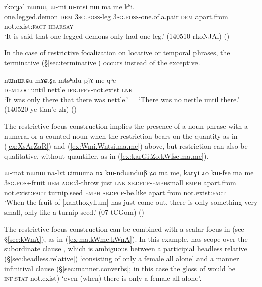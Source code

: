   \begin{exe}
\ex  \label{ex:Wmi.Wntsi.ma.me}
\gll  rkoŋɟɤl nɯnɯ, ɯ-mi ɯ-ntsi nɯ ma me kʰi.   \\
one.legged.demon \textsc{dem} \textsc{3sg}.\textsc{poss}-leg \textsc{3sg}.\textsc{poss}-one.of.a.pair \textsc{dem} apart.from not.exist:\textsc{fact} \textsc{hearsay} \\
\glt  `It is said that one-legged demons only had one leg.' (140510 rkoNJAl)
()
  \end{exe}
  
In the case of restrictive focalization on locative or temporal phrases,   the terminative  (§\ref{sec:terminative}) occurs instead of the exceptive.
  
\begin{exe}
\ex  \label{ex:nWnWtCu.mACtsxa.pjAme}
\gll  nɯnɯtɕu mɤɕtʂa mtsʰalu pjɤ-me qʰe \\
\textsc{dem}:\textsc{loc} until nettle  \textsc{ifr}.\textsc{ipfv}-not.exist \textsc{lnk} \\
\glt `It was only there that there was nettle.' =  `There was no nettle until there.' (140520 ye tian'e-zh)
()
\end{exe}
    
The restrictive focus construction implies the presence of a noun phrase with a numeral or a counted noun when the restriction bears on the quantity as in (\ref{ex:XsArZaR}) and (\ref{ex:Wmi.Wntsi.ma.me}) above, but restriction can also be qualitative, without quantifier, as in (\ref{ex:karGi.Zo.kWfse.ma.me}).

\begin{exe}
\ex \label{ex:karGi.Zo.kWfse.ma.me}
 \gll   ɯ-mat nɯnɯ na-lɤt ɕimɯma nɤ kɯ-ndɯ\redp{}ndɯβ ʑo ma me, karɣi ʑo kɯ-fse ma me  \\
 \textsc{3sg}.\textsc{poss}-fruit \textsc{dem} \textsc{aor}:3\flobv{}-throw just \textsc{lnk}  \textsc{sbj}:\textsc{pcp}-\textsc{emph}\redp{}small \textsc{emph} apart.from not.exist:\textsc{fact} turnip.seed \textsc{emph} \textsc{sbj}:\textsc{pcp}-be.like apart.from not.exist:\textsc{fact} \\
 \glt  `When the fruit of [xanthoxyllum] has just come out, there is only something very small, only like a turnip seed.'  (07-tCGom) 	()
\end{exe}
  
The restrictive focus construction can be combined with a scalar focus in  (see §\ref{sec:kWnA}), as in (\ref{ex:ma.kWme.kWnA}). In this example,  has scope over the subordinate clause , which is ambiguous between a participial headless relative (§\ref{sec:headless.relative}) `consisting of only a female all alone' and a manner infinitival clause (§\ref{sec:manner.converbs}; in this case the gloss of  would be \textsc{inf}:\textsc{stat}-not.exist) `even (when) there is only a female all alone'.

